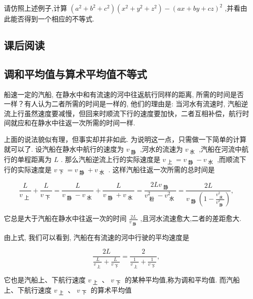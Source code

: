 \documentclass[a4paper,10pt,oneside,fontset=none]{ctexbook}
\numberwithin{equation}{chapter}
\begin{document}
请仿照上述例子,计算 $\left( {{a}^{2} + {b}^{2} + {c}^{2}}\right) \left( {{x}^{2} + {y}^{2} + {z}^{2}}\right)  - {\left( ax + by + cz\right) }^{2}$ ,并看由此能否得到一个相应的不等式.

\subsection*{课后阅读}

\subsection*{调和平均值与算术平均值不等式}

船速一定的汽船, 在静水中和有流速的河中往返航行同样的距离, 所需的时间是否一样？有人认为二者所需的时间是一样的, 他们的理由是: 当河水有流速时, 汽船逆流上行虽然速度要减慢，但回来时顺流下行的速度要加快，二者互相补偿，航行时间就应和在静水中往返一次所需的时间一样.

上面的说法貌似有理，但事实却并非如此. 为说明这一点，只需做一下简单的计算就可以了. 设汽船在静水中航行的速度为 ${v}_{\text{ 静 }}$ ,河水的流速为 ${v}_{\text{ 水 }}$ ,汽船在河流中航行的单程距离为 $L$ . 那么汽船逆流上行的实际速度是 ${v}_{\text{ 上 }} = {v}_{\text{ 静 }} - {v}_{\text{ 水 }}$ ,而顺流下行的实际速度是 ${v}_{\mathrm{\text{ 下 }}} = {v}_{\text{ 静 }} + {v}_{\text{ 水 }}$ . 这样汽船往返一次所需的总时间是

$$
\frac{L}{{v}_{\mathrm{\text{ 上 }}}} + \frac{L}{{v}_{\mathrm{\text{ 下 }}}} = \frac{L}{{v}_{\mathrm{\text{ 静 }}} - {v}_{\mathrm{\text{ 水 }}}} + \frac{L}{{v}_{\mathrm{\text{ 静 }}} + {v}_{\mathrm{\text{ 水 }}}} = \frac{{2L}{v}_{\mathrm{\text{ 静 }}}}{{v}_{\mathrm{\text{ 粉 }}}^{2} - {v}_{\mathrm{\text{ 水 }}}^{2}} = \frac{2L}{{v}_{\mathrm{\text{ 静 }}}\left( {1 - \frac{{v}_{\mathrm{\text{ 水 }}}^{2}}{{v}_{\mathrm{\text{ 静 }}}^{2}}}\right) },
$$

它总是大于汽船在静水中往返一次的时间 $\frac{2L}{{v}_{\text{ 静 }}}$ ,且河水流速愈大,二者的差距愈大.

由上式, 我们可以看到, 汽船在有流速的河中行驶的平均速度是

$$
\frac{2L}{\frac{L}{{v}_{\mathrm{\text{ 上 }}}} + \frac{L}{{v}_{\mathrm{\text{ 下 }}}}} = \frac{2}{\frac{1}{{v}_{\mathrm{\text{ 上 }}}} + \frac{1}{{v}_{\mathrm{\text{ 下 }}}}},
$$

它也是汽船上、下航行速度 ${v}_{\text{ 上 }}\text{ 、 }{v}_{\text{ 下 }}$ 的某种平均值,称为调和平均值. 而汽船上、下航行速度 ${v}_{\text{ 上 }}\text{ 、 }{v}_{\text{ 下 }}$ 的算术平均值
\end{document}
